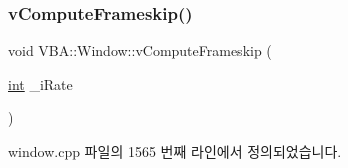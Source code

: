 \mbox{\label{class_v_b_a_1_1_window_abcfa3555126b7804609a8438ece3266e}} 
\subsubsection{\texorpdfstring{v\+Compute\+Frameskip()}{vComputeFrameskip()}}
{\footnotesize\ttfamily void V\+B\+A\+::\+Window\+::v\+Compute\+Frameskip (\begin{DoxyParamCaption}\item[{\mbox{\hyperlink{_util_8cpp_a0ef32aa8672df19503a49fab2d0c8071}{int}}}]{\+\_\+i\+Rate }\end{DoxyParamCaption})}



window.\+cpp 파일의 1565 번째 라인에서 정의되었습니다.


